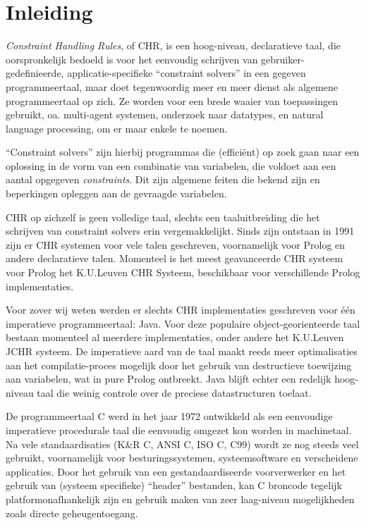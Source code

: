 \chapter{Inleiding}
\label{chap:inleiding}

{\em Constraint Handling Rules}, of CHR, is een hoog-niveau, declaratieve taal, die oorspronkelijk bedoeld is voor het eenvoudig schrijven van gebruiker-gedefinieerde, applicatie-specifieke ``constraint solvers'' in een gegeven programmeertaal, maar doet tegenwoordig meer en meer dienst als algemene programmeertaal op zich. Ze worden voor een brede waaier van toepassingen gebruikt, oa. multi-agent systemen, onderzoek naar datatypes, en natural language processing, om er maar enkele te noemen.

``Constraint solvers'' zijn hierbij programmas die (effici\"ent) op zoek gaan naar een oplossing in de vorm van een combinatie van variabelen, die voldoet aan een aantal opgegeven {\em constraints}. Dit zijn algemene feiten die bekend zijn en beperkingen opleggen aan de gevraagde variabelen.

CHR op zichzelf is geen volledige taal, slechts een taaluitbreiding die het schrijven van constraint solvers erin vergemakkelijkt. Sinds zijn ontstaan in 1991 zijn er CHR systemen voor vele talen geschreven, voornamelijk voor Prolog en andere declaratieve talen. Momenteel is het meest geavanceerde CHR systeem voor Prolog het K.U.Leuven CHR Systeem, beschikbaar voor verschillende Prolog implementaties. 

Voor zover wij weten werden er slechts CHR implementaties geschreven voor \'e\'en imperatieve programmeertaal: Java. Voor deze populaire object-georienteerde taal bestaan momenteel al meerdere implementaties, onder andere het K.U.Leuven JCHR systeem. De imperatieve aard van de taal maakt reeds meer optimalisaties aan het compilatie-proces mogelijk door het gebruik van destructieve toewijzing aan variabelen, wat in pure Prolog ontbreekt. Java blijft echter een redelijk hoog-niveau taal die weinig controle over de preciese datastructuren toelaat.

De programmeertaal C werd in het jaar 1972 ontwikkeld als een eenvoudige imperatieve procedurale taal die eenvoudig omgezet kon worden in machinetaal. Na vele standaardisaties (K\&R C, ANSI C, ISO C, C99) wordt ze nog steeds veel gebruikt, voornamelijk voor besturingssystemen, systeemsoftware en verscheidene applicaties. Door het gebruik van een gestandaardiseerde voorverwerker en het gebruik van (systeem specifieke) ``header'' bestanden, kan C broncode tegelijk platformonafhankelijk zijn en gebruik maken van zeer laag-niveau mogelijkheden zoals directe geheugentoegang.

